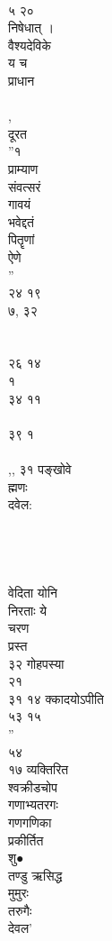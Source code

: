 \documentclass[11pt, openany]{book}
\begin{document}
{{{{{{{{{{{{{{{{{{{{{{{{{{{{{{{{{{{{{{{{{{{{{{{{{{{{{{{{{{{{{{{{{{{{{{{{{{{{{{{{{{{{{{{{{{{{{{{{{{{{{{{{{{{{{{{{{{{{{{{{{{{{{{{{{{{{{{{{{{{{{{{{{{{{{{{{{{{{{{{{{{{{{{{{\\
५ २०\\
निषेधात् ।\\
वैश्यदेविके\\
य च\\
प्राधान\\
~\\
,\\
दूरत\\
''१\\
प्राम्याण\\
संवत्सरं\\
गावयं\\
भवेद्दतं\\
पितॄणां\\
ऐणे\\
''\\
२४ १९\\
७, ३२\\
~\\
~\\
२६ १४\\
१\\
३४ ११\\
~\\
३९ १\\
~\\
,, ३१ पङ्खोवे\\
ह्मणः\\
दवेल:\\
~\\
~\\
~\\
~\\
वेदिता योनि\\
निरताः ये\\
चरण\\
प्रस्त\\
३२ गोहपस्या\\
२१\\
३१ १४ क्कादयोऽपीति\\
५३ १५\\
''\\
५४\\
१७ व्यक्तिरित\\
श्वक्रीडचोप\\
गणाभ्यतरगः\\
गणगणिका\\
प्रकीर्तित\\
शु●\\
तण्डु ऋसिद्ध\\
मुमुरः\\
तरुगैः\\
देवल'\\
}}}}}}}}}}}}}}}}}}}}}}}}}}}}}}}}}}}}}}}}}}}}}}}}}}}}}}}}}}}}}}}}}}}}}}}}}}}}}}}}}}}}}}}}}}}}}}}}}}}}}}}}}}}}}}}}}}}}}}}}}}}}}}}}}}}}}}}}}}}}}}}}}}}}}}}}}}}}}}}}}}}}}}}}
\end{document}
